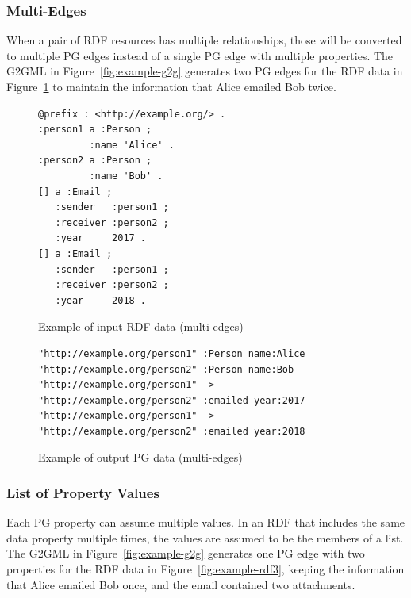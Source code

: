 \documentclass[runningheads]{llncs}
\begin{document}
\subsubsection{Multi-Edges}
When a pair of RDF resources has multiple relationships, those will be converted to multiple PG edges instead of a single PG edge with multiple properties. The G2GML in Figure~\ref{fig:example-g2g} generates two PG edges for the RDF data in Figure~\ref{fig:example-rdf2} to maintain the information that Alice emailed Bob twice.

\begin{figure}[!t]
\begin{scriptsize}
\begin{verbatim}
@prefix : <http://example.org/> .
:person1 a :Person ;
         :name 'Alice' .
:person2 a :Person ;
         :name 'Bob' .
[] a :Email ;
   :sender   :person1 ;
   :receiver :person2 ;
   :year     2017 .
[] a :Email ;
   :sender   :person1 ;
   :receiver :person2 ;
   :year     2018 .
\end{verbatim}
\end{scriptsize}
\caption{Example of input RDF data (multi-edges)}
\label{fig:example-rdf2}
\end{figure}


\begin{figure}[!t]
\begin{scriptsize}
\begin{verbatim}
"http://example.org/person1" :Person name:Alice
"http://example.org/person2" :Person name:Bob
"http://example.org/person1" -> "http://example.org/person2" :emailed year:2017
"http://example.org/person1" -> "http://example.org/person2" :emailed year:2018
\end{verbatim}
\end{scriptsize}
\caption{Example of output PG data (multi-edges)}
\label{fig:example-pg2}
\end{figure}

\subsubsection{List of Property Values}
Each PG property can assume multiple values. In an RDF that includes the same data property multiple times, the values are assumed to be the members of a list. The G2GML in Figure~\ref{fig:example-g2g} generates one PG edge with two properties for the RDF data in Figure~\ref{fig:example-rdf3}, keeping the information that Alice emailed Bob once, and the email contained two attachments.
\end{document}
